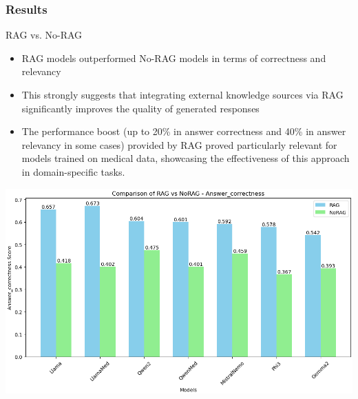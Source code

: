 \documentclass[handout]{beamer}\mode<handout>{\usetheme{AMSBolognaFC}}
\begin{document}
\begin{frame}[allowframebreaks]
    \frametitle{Results}

    \begin{block}{RAG vs. No-RAG}
        \begin{itemize}
            \item RAG models outperformed No-RAG models in terms of \alert{correctness} and \alert{relevancy}
            \item This strongly suggests that integrating external knowledge sources via RAG \alert{significantly improves} the quality of generated responses
            \item The performance boost (\alert{up to 20\%} in answer correctness and \alert{40\%} in answer relevancy in some cases) provided by RAG proved particularly relevant for models trained on medical data, showcasing the effectiveness of this approach in domain-specific tasks.
        \end{itemize}
    \end{block}

    \framebreak

    \vfill
    \centering
    \includegraphics[width=\textwidth]{figures/RAGvsNoRAG_correctness}

    \framebreak


\end{frame}
\end{document}
